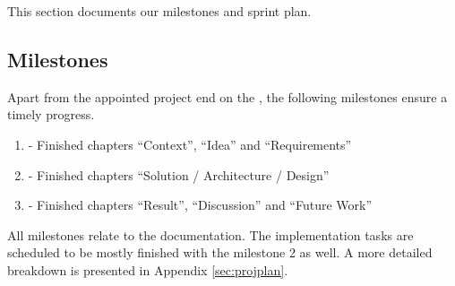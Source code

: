 This section documents our milestones and sprint plan.

\subsection{Milestones}

Apart from the appointed project end on the , the following milestones ensure a timely progress.

\begin{enumerate}
\item \textbf{} - Finished chapters \enquote{Context}, \enquote{Idea} and \enquote{Requirements}
\item \textbf{} - Finished chapters \enquote{Solution / Architecture / Design}
\item \textbf{} - Finished chapters \enquote{Result}, \enquote{Discussion} and \enquote{Future Work}
\end{enumerate}

All milestones relate to the documentation. The implementation tasks are scheduled to be mostly finished with the milestone 2 as well. A more detailed breakdown is presented in Appendix \ref{sec:projplan}.
